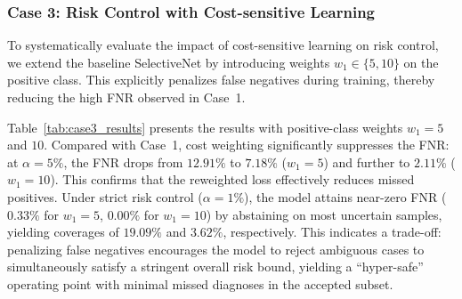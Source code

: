 \documentclass[journal]{IEEEtran}
\theoremstyle{remark}
\begin{document}
\subsubsection{\textbf{Case 3: Risk Control with Cost-sensitive Learning}}
\label{sec:case3_results}

To systematically evaluate the impact of cost-sensitive learning on risk control, we extend the baseline SelectiveNet by introducing weights $w_1 \in \{5, 10\}$ on the positive class. This explicitly penalizes false negatives during training, thereby reducing the high FNR observed in Case~1.

\begin{table}[htbp]
    \centering
    \caption{The selective classification performance of Case 3 ($w_{1}=5$ and $w_{1}=10$).}
    \label{tab:case3_results}
    \vskip -0.1in
    \vskip -0.1in
\end{table}

Table~\ref{tab:case3_results} presents the results with positive-class weights $w_1 = 5$ and $10$. Compared with Case~1, cost weighting significantly suppresses the FNR: at $\alpha=5\%$, the FNR drops from $12.91\%$ to $7.18\%$ ($w_1=5$) and further to $2.11\%$ ($w_1=10$). This confirms that the reweighted loss effectively reduces missed positives. Under strict risk control ($\alpha=1\%$), the model attains near-zero FNR ($0.33\%$ for $w_1=5$, $0.00\%$ for $w_1=10$) by abstaining on most uncertain samples, yielding coverages of $19.09\%$ and $3.62\%$, respectively. This indicates a trade-off: penalizing false negatives encourages the model to reject ambiguous cases to simultaneously satisfy a stringent overall risk bound, yielding a “hyper-safe” operating point with minimal missed diagnoses in the accepted subset.
\end{document}
